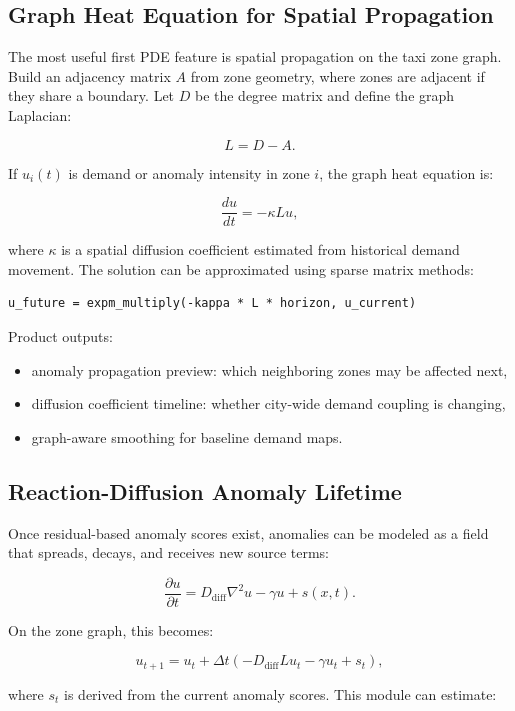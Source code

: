 \documentclass[11pt]{article}
\begin{document}
\subsection{Graph Heat Equation for Spatial Propagation}

The most useful first PDE feature is spatial propagation on the taxi zone graph. Build an adjacency matrix $A$ from zone geometry, where zones are adjacent if they share a boundary. Let $D$ be the degree matrix and define the graph Laplacian:

\[
    L = D - A.
\]

If $u_i(t)$ is demand or anomaly intensity in zone $i$, the graph heat equation is:

\[
    \frac{du}{dt} = -\kappa L u,
\]

where $\kappa$ is a spatial diffusion coefficient estimated from historical demand movement. The solution can be approximated using sparse matrix methods:

\begin{lstlisting}
u_future = expm_multiply(-kappa * L * horizon, u_current)
\end{lstlisting}

Product outputs:

\begin{itemize}
    \item anomaly propagation preview: which neighboring zones may be affected next,
    \item diffusion coefficient timeline: whether city-wide demand coupling is changing,
    \item graph-aware smoothing for baseline demand maps.
\end{itemize}

\subsection{Reaction-Diffusion Anomaly Lifetime}

Once residual-based anomaly scores exist, anomalies can be modeled as a field that spreads, decays, and receives new source terms:

\[
    \frac{\partial u}{\partial t} = D_{\mathrm{diff}}\nabla^2 u - \gamma u + s(x,t).
\]

On the zone graph, this becomes:

\[
    u_{t+1} = u_t + \Delta t(-D_{\mathrm{diff}} L u_t - \gamma u_t + s_t),
\]

where $s_t$ is derived from the current anomaly scores. This module can estimate:
\end{document}

